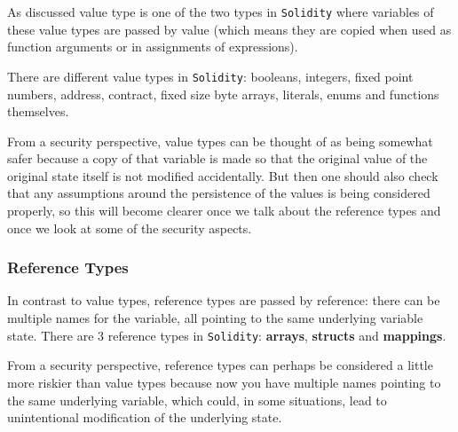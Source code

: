 As discussed value type is one of the two types in \texttt{Solidity}
where variables of these value types are passed by value (which means
they are copied when used as function arguments or in assignments of
expressions).

There are different value types in \texttt{Solidity}: booleans,
integers, fixed point numbers, address, contract, fixed size byte
arrays, literals, enums and functions themselves.

From a security perspective, value types can be thought of as being
somewhat safer because a copy of that variable is made so that the
original value of the original state itself is not modified
accidentally. But then one should also check that any assumptions around
the persistence of the values is being considered properly, so this will
become clearer once we talk about the reference types and once we look
at some of the security aspects.

\subsubsection{Reference Types}\label{reference-types}

In contrast to value types, reference types are passed by reference:
there can be multiple names for the variable, all pointing to the same
underlying variable state. There are 3 reference types in
\texttt{Solidity}: \textbf{arrays}, \textbf{structs} and
\textbf{mappings}.

From a security perspective, reference types can perhaps be considered a
little more riskier than value types because now you have multiple names
pointing to the same underlying variable, which could, in some
situations, lead to unintentional modification of the underlying state.

